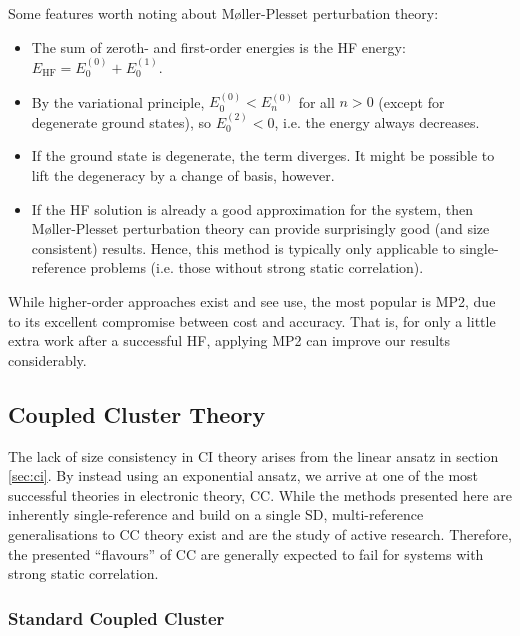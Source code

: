 Some features worth noting about M{\o}ller-Plesset perturbation theory:
\begin{itemize}
    \item The sum of zeroth- and first-order energies is the HF energy: $E_\mathrm{HF} = E_0^{(0)} + E_0^{(1)}$.
    \item By the variational principle, $E_0^{(0)}<E_n^{(0)}$ for all $n>0$ (except for degenerate ground states), so $E_0^{(2)}<0$, i.e. the energy always decreases.
    \item If the ground state is degenerate, the term diverges. It might be possible to lift the degeneracy by a change of basis, however.
    \item If the \gls{HF} solution is already a good approximation for the system, then M{\o}ller-Plesset perturbation theory can provide surprisingly good (and size consistent) results. Hence, this method is typically only applicable to single-reference problems (i.e. those without strong static correlation).
\end{itemize}

While higher-order approaches exist and see use, the most popular is \gls{MP2}, due to its excellent compromise between cost and accuracy. That is, for only a little extra work after a successful \gls{HF}, applying \gls{MP2} can improve our results considerably.

\subsection{Coupled Cluster Theory}

The lack of size consistency in \gls{CI} theory arises from the linear ansatz in section \ref{sec:ci}. By instead using an exponential ansatz, we arrive at one of the most successful theories in electronic theory, \gls{CC}.\cite{cizekCorrelation1966,cizekCorrelation1971,paldusTimeIndependent1975,shavittManyBody2009} While the methods presented here are inherently single-reference and build on a single \gls{SD}, multi-reference generalisations to \gls{CC} theory exist and are the study of active research.\cite{aotoInternally2016,evangelistaPerspective2018,hanauerPilot2011,jankowskiApplicability1992,jeziorskiCoupledcluster1981,kohnImproved2020} Therefore, the presented ``flavours'' of \gls{CC} are generally expected to fail for systems with strong static correlation.

\subsubsection{Standard Coupled Cluster}

